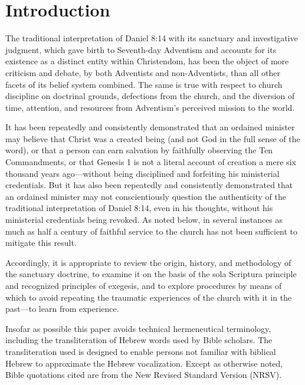 \chapter*{Introduction}
\label{ch:intro}

The traditional interpretation of Daniel 8:14 with its sanctuary and investigative
judgment, which gave birth to Seventh-day Adventism and accounts for its
existence as a distinct entity within Christendom, has been the object of more
criticism and debate, by both Adventists and non-Adventists, than all other facets
of its belief system combined. The same is true with respect to church discipline
on doctrinal grounds, defections from the church, and the diversion of time,
attention, and resources from Adventism's perceived mission to the world.

It has been repeatedly and consistently demonstrated that an ordained minister
may believe that Christ was a created being (and not God in the full sense of the
word), or that a person can earn salvation by faithfully observing the Ten
Commandments, or that Genesis 1 is not a literal account of creation a mere six
thousand years ago---without being disciplined and forfeiting his ministerial
credentials. But it has also been repeatedly and consistently demonstrated that
an ordained minister may not conscientiously question the authenticity of the
traditional interpretation of Daniel 8:14, even in his thoughts, without his
ministerial credentials being revoked. As noted below, in several instances as
much as half a century of faithful service to the church has not been sufficient to
mitigate this result.

Accordingly, it is appropriate to review the origin, history, and methodology of
the sanctuary doctrine, to examine it on the basis of the sola Scriptura principle
and recognized principles of exegesis, and to explore procedures by means of
which to avoid repeating the traumatic experiences of the church with it in the
past---to learn from experience.

Insofar as possible this paper avoids technical hermeneutical terminology,
including the transliteration of Hebrew words used by Bible scholars. The
transliteration used is designed to enable persons not familiar with biblical
Hebrew to approximate the Hebrew vocalization. Except as otherwise noted, Bible
quotations cited are from the New Revised Standard Version (NRSV).
